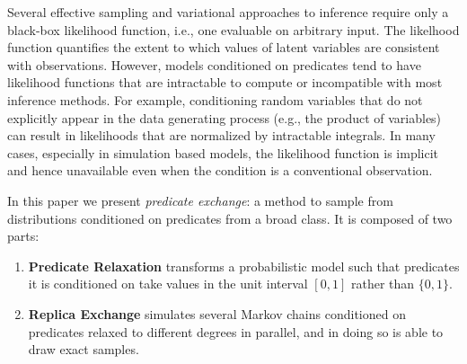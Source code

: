 



Several effective sampling  \citep{andrieu2003introduction} and variational  \citep{jordan1999introduction, ranganath2014black} approaches to inference require only a black-box likelihood function, i.e., one evaluable on arbitrary input.
The likelhood function quantifies the extent to which values of latent variables are consistent with observations. 
However, models conditioned on predicates tend to have likelihood functions that are intractable to compute or incompatible with most inference methods.
For example, conditioning random variables that do not explicitly appear in the data generating process (e.g., the product of variables) can result in likelihoods that are normalized by intractable integrals.	
In many cases, especially in simulation based models, the likelihood function is implicit and hence unavailable even when the condition is a conventional observation.

In this paper we present \emph{predicate exchange}:
a method to sample from distributions conditioned on predicates from a broad class.
It is composed of two parts:
\begin{enumerate}
\item \textbf{Predicate Relaxation} transforms a probabilistic model such that predicates it is conditioned on take values in the unit interval $[0, 1]$ rather than $\{0, 1\}$.
\item  \textbf{Replica Exchange} simulates several Markov chains  conditioned on predicates relaxed to different degrees in parallel, and in doing so is able to draw exact samples. 
\end{enumerate}

